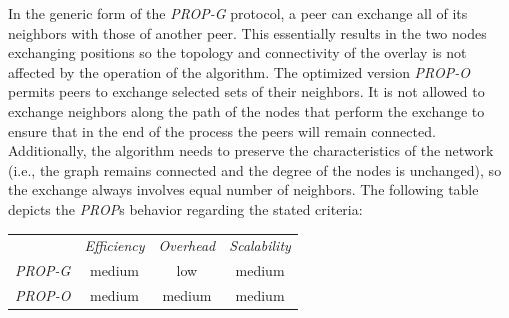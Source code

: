 In the generic form of the \emph{PROP-G} protocol, a peer can exchange all of
its neighbors with those of another peer. This essentially results in the two
nodes exchanging positions so the topology and connectivity of the overlay is
not affected by the operation of the algorithm. The optimized version
\emph{PROP-O} permits peers to exchange selected sets of their neighbors. It is
not allowed to exchange neighbors along the path of the nodes that perform the
exchange to ensure that in the end of the process the peers will remain
connected. Additionally, the algorithm needs to preserve the characteristics of
the network (i.e., the graph remains connected and the degree of the
nodes is unchanged), so the exchange always involves equal number of neighbors.
The following table depicts the \emph{PROP}s behavior 
regarding the stated criteria:
\begin{center}
{\footnotesize
\begin{tabular}{rccc}
\multicolumn{1}{r}{} &
\multicolumn{1}{c}{\emph{Efficiency}} &
\multicolumn{1}{c}{\emph{Overhead}} &
\multicolumn{1}{c}{\emph{Scalability}}
\\
\cline{2-4}
\emph{PROP-G} &
medium &
low &
medium \\
\emph{PROP-O} &
medium &
medium &
medium \\
\end{tabular}
}
\end{center}



